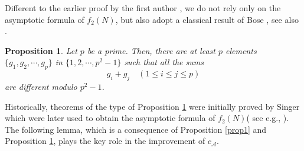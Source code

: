 \documentclass[12pt,a4paper,reqno]{amsart}
\numberwithin{equation}{section}
\theoremstyle{plain}
\newtheorem{proposition}{Proposition}
\theoremstyle{definition}
\begin{document}
Different to the earlier proof by the first author \cite{Ding}, we do not rely only on the asymptotic formula of $f_2(N)$, but also adopt a classical result of Bose \cite{Bose}, see also \cite[Theorem 3, page 81]{Sidon}.
\begin{proposition}\label{prop2}
Let $p$ be a prime. Then, there are at least $p$ elements $\{g_1,g_2,\cdots, g_p\}$ in $\big\{1,2,\cdots,p^2-1\big\}$ such that all the sums
$$
g_i+g_j \quad (1\le i\le j\le p)
$$ 
are different modulo $p^2-1$.
\end{proposition}
Historically, theorems of the type of Proposition \ref{prop2} were initially proved by Singer \cite{Singer} which were later used to obtain the asymptotic formula of $f_2(N)$( see e.g., \cite{Chowla,Erdos-2}).
The following lemma, which is a consequence of Proposition \ref{prop1} and Proposition \ref{prop2}, plays the key role in the improvement of $c_{\mathscr{A}}$.
\end{document}
